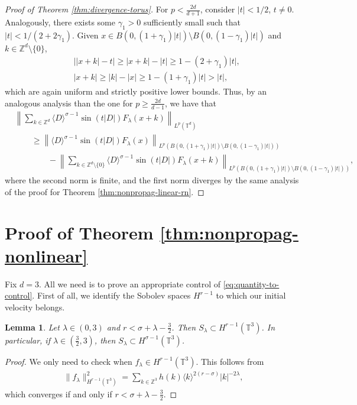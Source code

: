 \documentclass[a4paper, reqno, 11pt]{amsart}
\newtheorem{lemma}[theorem]{Lemma}
\theoremstyle{definition}
\begin{document}
\begin{proof}[Proof of Theorem \ref{thm:divergence-torus}]
For $p < \frac{2d}{d+1}$, consider $|t| < 1/2$, $t \neq 0$. Analogously, there exists some $\gamma_1 > 0$ sufficiently small such that $|t| < 1/(2 + 2\gamma_1)$. Given $x \in B(0, (1  + \gamma_1) |t|) \setminus B(0, (1 - \gamma_1)|t|)$ and $k \in \mathbb{Z}^d \setminus \{0\}$,
\begin{align*}
&\left| |x+k| - t\right| \geq |x+k| - |t| \geq 1 - (2 + \gamma_1)|t|, \nonumber \\
& |x+k| \geq |k| - |x| \geq 1 - (1 + \gamma_1)|t| > |t|,
\end{align*}
which are again uniform and strictly positive lower bounds. Thus, by an analogous analysis than the one for $p \geq \frac{2d}{d-1}$, we have that
\begin{align*}
&\left\| \sum_{k \in \mathbb{Z}^d}  \langle D \rangle^{\sigma-1} \sin(t|D|) F_{\lambda}(x+k)  \right\|_{L^p(\mathbb{T}^d)} \nonumber \\
&\qquad \geq \left\|  \langle D \rangle^{\sigma-1} \sin(t|D|) F_{\lambda}(x)  \right\|_{L^p(B(0,(1 + \gamma_1)|t|) \setminus B(0,(1 - \gamma_1)|t|))} \nonumber \\
&\qquad \qquad - \left\| \sum_{k \in \mathbb{Z}^d \setminus \{0\}} \langle D \rangle^{\sigma-1} \sin(t|D|) F_{\lambda}(x+k)  \right\|_{L^p(B(0,(1 + \gamma_1)|t|) \setminus B(0,(1 - \gamma_1)|t|))},
\end{align*}
where the second norm is finite, and the first norm diverges by the same analysis of the proof for Theorem \ref{thm:nonpropag-linear-rn}.
\end{proof}

\section{Proof of Theorem \ref{thm:nonpropag-nonlinear}}\label{sec:proof-nonlinearcex}
Fix $d = 3$. All we need is to prove an appropriate control of \eqref{eq:quantity-to-control}. First of all, we identify the Sobolev spaces $H^{r-1}$ to which our initial velocity belongs.

\begin{lemma}\label{lemma:Hlambda-Hr}
	Let $\lambda \in (0,3)$ and $r < \sigma + \lambda - \frac{3}{2}$. Then $S_{\lambda} \subset H^{r-1}(\mathbb{T}^3)$. In particular, if $\lambda \in (\frac{3}{2},3)$, then $S_{\lambda} \subset H^{\sigma-1}(\mathbb{T}^3)$.
	\end{lemma}
	\begin{proof}
	We only need to check when $f_{\lambda} \in H^{r-1}(\mathbb{T}^3)$. This follows from
	\begin{align*}
	\|f_{\lambda}\|_{H^{r-1}(\mathbb{T}^3)}^2 = \sum_{k \in \mathbb{Z}^3} h(k) \langle k \rangle^{2(r-\sigma)} |k|^{-2\lambda},
	\end{align*}
	which converges if and only if $r < \sigma + \lambda - \frac{3}{2}$.
	\end{proof}
	
\end{document}
